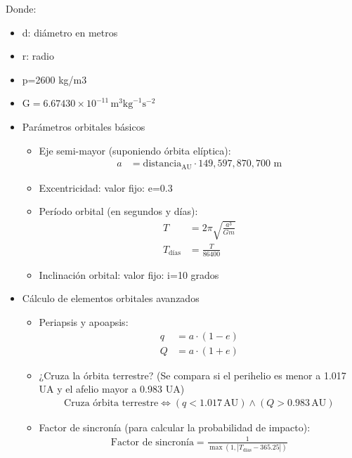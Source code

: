\documentclass[12pt]{article}
\begin{document}
Donde:
\begin{itemize}
  \item d: diámetro en metros
  \item r: radio
  \item p=2600 kg/m3
  \item $\text{G}=6.67430\times 10^{-11}\,\text{m}^3\text{kg}^{-1}\text{s}^{-2}$
\end{itemize}

\begin{itemize}
  \item Parámetros orbitales básicos
  \begin{itemize}
    \item Eje semi-mayor (suponiendo órbita elíptica):
      \begin{align*}
        a &= \text{distancia}_{\text{AU}} \cdot 149{,}597{,}870{,}700 \text{ m}
      \end{align*}
    \item Excentricidad: valor fijo: e=0.3
    \item Período orbital (en segundos y días):
      \begin{align*}
        T &= 2 \pi \sqrt{\frac{a^3}{G m}} \\
        T_{\text{días}} &= \frac{T}{86400}
      \end{align*}
    \item Inclinación orbital: valor fijo: i=10 grados
  \end{itemize}
\end{itemize}

\begin{itemize}
  \item Cálculo de elementos orbitales avanzados
  \begin{itemize}
    \item Periapsis y apoapsis:
      \begin{align*}
        q &= a \cdot (1 - e) \\
        Q &= a \cdot (1 + e)
      \end{align*}
    \item ¿Cruza la órbita terrestre? (Se compara si el perihelio es menor a 1.017 UA y el afelio mayor a 0.983 UA)
      \begin{align*}
        \text{Cruza órbita terrestre} \iff
        \left(q < 1.017 \, \text{AU}\right) \land \left(Q > 0.983 \, \text{AU}\right)
      \end{align*}
    \item Factor de sincronía (para calcular la probabilidad de impacto):
      \begin{align*}
        \text{Factor de sincronía} = \frac{1}{\max\left(1, \left|T_{\text{días}} - 365.25\right|\right)}
      \end{align*}
  \end{itemize}
\end{itemize}
\end{document}
